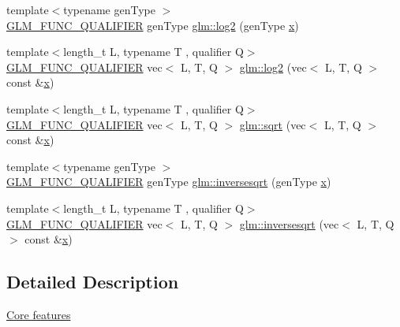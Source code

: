 \begin{DoxyCompactItemize}
\item 
{\footnotesize template$<$typename gen\+Type $>$ }\\\hyperlink{setup_8hpp_a33fdea6f91c5f834105f7415e2a64407}{G\+L\+M\+\_\+\+F\+U\+N\+C\+\_\+\+Q\+U\+A\+L\+I\+F\+I\+ER} gen\+Type \hyperlink{namespaceglm_ab47f0f29ead9cefd62d62ba5f83fe81b}{glm\+::log2} (gen\+Type \hyperlink{_s_d_l__opengl_8h_ad0e63d0edcdbd3d79554076bf309fd47}{x})
\item 
{\footnotesize template$<$length\+\_\+t L, typename T , qualifier Q$>$ }\\\hyperlink{setup_8hpp_a33fdea6f91c5f834105f7415e2a64407}{G\+L\+M\+\_\+\+F\+U\+N\+C\+\_\+\+Q\+U\+A\+L\+I\+F\+I\+ER} vec$<$ L, T, Q $>$ \hyperlink{group__core__func__exponential_ga82831c7d9cca777cebedfe03a19c8d75}{glm\+::log2} (vec$<$ L, T, Q $>$ const \&\hyperlink{_s_d_l__opengl_8h_ad0e63d0edcdbd3d79554076bf309fd47}{x})
\item 
{\footnotesize template$<$length\+\_\+t L, typename T , qualifier Q$>$ }\\\hyperlink{setup_8hpp_a33fdea6f91c5f834105f7415e2a64407}{G\+L\+M\+\_\+\+F\+U\+N\+C\+\_\+\+Q\+U\+A\+L\+I\+F\+I\+ER} vec$<$ L, T, Q $>$ \hyperlink{group__core__func__exponential_gaa83e5f1648b7ccdf33b87c07c76cb77c}{glm\+::sqrt} (vec$<$ L, T, Q $>$ const \&\hyperlink{_s_d_l__opengl_8h_ad0e63d0edcdbd3d79554076bf309fd47}{x})
\item 
{\footnotesize template$<$typename gen\+Type $>$ }\\\hyperlink{setup_8hpp_a33fdea6f91c5f834105f7415e2a64407}{G\+L\+M\+\_\+\+F\+U\+N\+C\+\_\+\+Q\+U\+A\+L\+I\+F\+I\+ER} gen\+Type \hyperlink{namespaceglm_a5e3dd2bba414db15477d43ca9d71acf5}{glm\+::inversesqrt} (gen\+Type \hyperlink{_s_d_l__opengl_8h_ad0e63d0edcdbd3d79554076bf309fd47}{x})
\item 
{\footnotesize template$<$length\+\_\+t L, typename T , qualifier Q$>$ }\\\hyperlink{setup_8hpp_a33fdea6f91c5f834105f7415e2a64407}{G\+L\+M\+\_\+\+F\+U\+N\+C\+\_\+\+Q\+U\+A\+L\+I\+F\+I\+ER} vec$<$ L, T, Q $>$ \hyperlink{group__core__func__exponential_ga523dd6bd0ad9f75ae2d24c8e4b017b7a}{glm\+::inversesqrt} (vec$<$ L, T, Q $>$ const \&\hyperlink{_s_d_l__opengl_8h_ad0e63d0edcdbd3d79554076bf309fd47}{x})
\end{DoxyCompactItemize}


\subsection{Detailed Description}
\hyperlink{group__core}{Core features} 